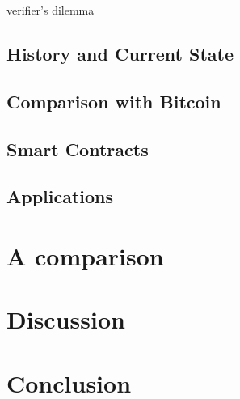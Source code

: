 \cite{Luu:2015:DIC:2810103.2813659} verifier's dilemma

\subsection{History and Current State}

\subsection{Comparison with Bitcoin}

\subsection{Smart Contracts}

\subsection{Applications}





\section{A comparison}

\section{Discussion}

\section{Conclusion}

